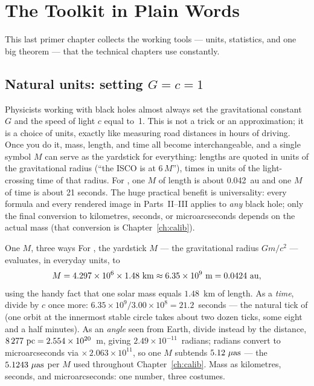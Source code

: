 \chapter{The Toolkit in Plain Words}
\label{ch:f6}

\noindent This last primer chapter collects the working tools — units,
statistics, and one big theorem — that the technical chapters use
constantly.

\section{Natural units: setting $G = c = 1$}

Physicists working with black holes almost always set the gravitational
constant $G$ and the speed of light $c$ equal to~1. This is not a trick
or an approximation; it is a choice of units, exactly like measuring
road distances in hours of driving. Once you do it, mass, length, and
time all become interchangeable, and a single symbol $M$ can serve as
the yardstick for everything: lengths are quoted in units of the
gravitational radius (``the ISCO is at $6\,M$''), times in units of the
light-crossing time of that radius. For \sgra{}, one $M$ of length is
about 0.042~au and one $M$ of time is about 21 seconds. The huge
practical benefit is universality: every formula and every rendered
image in Parts~II--III applies to \emph{any} black hole; only the final
conversion to kilometres, seconds, or microarcseconds depends on the
actual mass (that conversion is Chapter~\ref{ch:calib}).

\begin{worked}{One $M$, three ways}
For \sgra{}, the yardstick $M$ — the gravitational radius $Gm/c^2$ —
evaluates, in everyday units, to
\[
M = 4.297\times10^{6}\times1.48~{\rm km}
\approx 6.35\times10^{9}~{\rm m} = 0.0424~{\rm au},
\]
using the handy fact that one solar mass equals $1.48$~km of length. As
a \emph{time}, divide by $c$ once more:
$6.35\times10^{9}/3.00\times10^{8} = 21.2$~seconds — the natural tick
of \sgra{} (one orbit at the innermost stable circle takes about two
dozen ticks, some eight and a half minutes). As an \emph{angle} seen
from Earth, divide instead by the distance,
$8\,277~{\rm pc} = 2.554\times10^{20}$~m, giving
$2.49\times10^{-11}$~radians; radians convert to microarcseconds via
$\times\,2.063\times10^{11}$, so one $M$ subtends
$5.12~\mu\mathrm{as}$ — the $5.1243~\mu\mathrm{as}$ per $M$ used throughout
Chapter~\ref{ch:calib}. Mass as kilometres, seconds, and
microarcseconds: one number, three costumes.
\end{worked}

